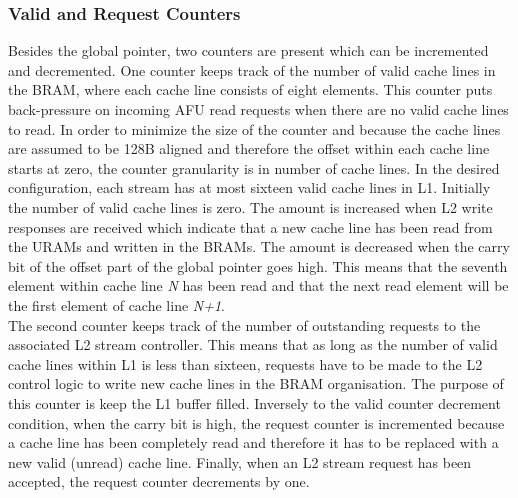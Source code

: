 \subsubsection{Valid and Request Counters}
Besides the global pointer, two counters are present which can be incremented and decremented. One counter keeps track of the number of valid cache lines in the BRAM, where each cache line consists of eight elements. This counter puts back-pressure on incoming AFU read requests when there are no valid cache lines to read. In order to minimize the size of the counter and because the cache lines are assumed to be 128B aligned and therefore the offset within each cache line starts at zero, the counter granularity is in number of cache lines. In the desired configuration, each stream has at most sixteen valid cache lines in L1. Initially the number of valid cache lines is zero. The amount is increased when L2 write responses are received which indicate that a new cache line has been read from the URAMs and written in the BRAMs. The amount is decreased when the carry bit of the offset part of the global pointer goes high. This means that the seventh element within cache line \textit{N} has been read and that the next read element will be the first element of cache line \textit{N+1}.\\
The second counter keeps track of the number of outstanding requests to the associated L2 stream controller. This means that as long as the number of valid cache lines within L1 is less than sixteen, requests have to be made to the L2 control logic to write new cache lines in the BRAM organisation. The purpose of this counter is keep the L1 buffer filled. Inversely to the valid counter decrement condition, when the carry bit is high, the request counter is incremented because a cache line has been completely read and therefore it has to be replaced with a new valid (unread) cache line. Finally, when an L2 stream request has been accepted, the request counter decrements by one.

